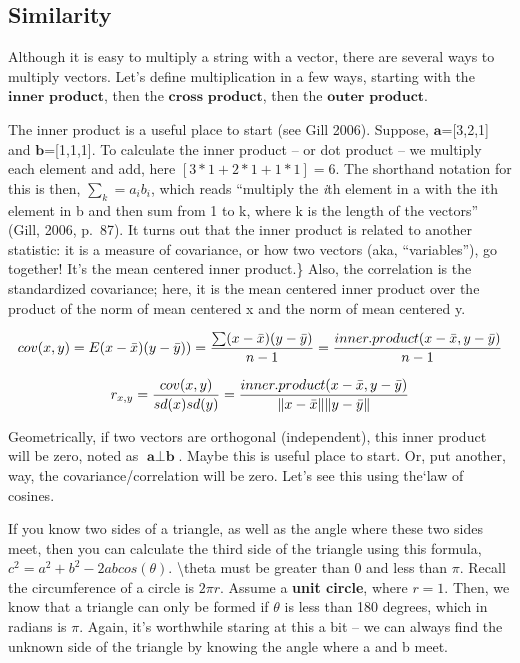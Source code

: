 \documentclass[
]{book}
\begin{document}
\subsection{Similarity}\label{similarity}

Although it is easy to multiply a string with a vector, there are
several ways to multiply vectors. Let's define multiplication in a few
ways, starting with the \(\textbf{inner product}\), then the
\(\textbf{cross product}\), then the \(\textbf{outer product}\).

The inner product is a useful place to start (see Gill 2006). Suppose,
\(\textbf{a}\)={[}3,2,1{]} and \(\textbf{b}\)={[}1,1,1{]}. To calculate the
inner product -- or dot product -- we multiply each element and add, here \([3*1+2*1+1*1]=6\). The shorthand notation for this is then, \(\sum_k=a_ib_i\), which reads ``multiply
the \emph{i}th element in a with the ith element in b and then sum from 1
to k, where k is the length of the vectors'' (Gill, 2006, p.~87). It
turns out that the inner product is related to another statistic: it is
a measure of covariance, or how two vectors (aka, ``variables''), go
together! It's the mean centered inner product.\} Also, the correlation
is the standardized covariance; here, it is the mean centered
inner product over the product of the norm of mean centered x and the
norm of mean centered y.

\[cov(x,y)=E(x-\bar{x})(y-\bar{y}))={{\sum(x-\bar{x})(y-\bar{y})}\over{n-1}}={{inner.product(x-\bar{x}, y-\bar{y})}\over{n-1}}\]

\[r_{x,y}={{cov(x,y)}\over{sd(x)sd(y)}}={{inner.product(x-\bar{x}, y-\bar{y})}\over{\|x-\bar{x}\|\|y-\bar{y}\|}}\]

Geometrically, if two vectors are orthogonal (independent), this inner product will be zero, noted as \(\textbf{a} \perp \textbf{b}\). Maybe this is useful place to start. Or, put another, way, the covariance/correlation will be zero. Let's see this using the`law
of cosines.

If you know two sides of a triangle, as well as the angle where these
two sides meet, then you can calculate the third side of the triangle
using this formula, \(c^2=a^2+b^2-2 a b cos(\theta)\). \textbackslash theta must be
greater than 0 and less than \(\pi\). Recall the circumference of a
circle is \(2\pi r\). Assume a \textbf{unit circle}, where \(r=1\). Then,
we know that a triangle can only be formed if \(\theta\) is less than
180 degrees, which in radians is \(\pi\). Again, it's worthwhile
staring at this a bit -- we can always find the unknown side of the
triangle by knowing the angle where a and b meet.
\end{document}
